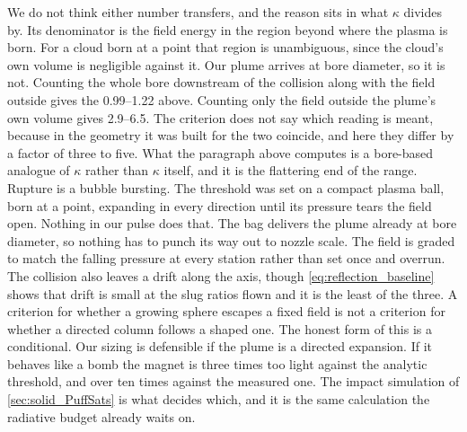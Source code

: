 \documentclass{article}
\begin{document}
We do not think either number transfers, and the reason sits in what $\kappa$ divides by. Its denominator is the field energy in the region beyond where the plasma is born. For a cloud born at a point that region is unambiguous, since the cloud's own volume is negligible against it. Our plume arrives at bore diameter, so it is not. Counting the whole bore downstream of the collision along with the field outside gives the \numrange{0.99}{1.22} above. Counting only the field outside the plume's own volume gives \numrange{2.9}{6.5}. The criterion does not say which reading is meant, because in the geometry it was built for the two coincide, and here they differ by a factor of three to five. What the paragraph above computes is a bore-based analogue of $\kappa$ rather than $\kappa$ itself, and it is the flattering end of the range. Rupture is a bubble bursting. The threshold was set on a compact plasma ball, born at a point, expanding in every direction until its pressure tears the field open. Nothing in our pulse does that. The bag delivers the plume already at bore diameter, so nothing has to punch its way out to nozzle scale. The field is graded to match the falling pressure at every station rather than set once and overrun. The collision also leaves a drift along the axis, though \autoref{eq:reflection_baseline} shows that drift is small at the slug ratios flown and it is the least of the three. A criterion for whether a growing sphere escapes a fixed field is not a criterion for whether a directed column follows a shaped one. The honest form of this is a conditional. Our sizing is defensible if the plume is a directed expansion. If it behaves like a bomb the magnet is three times too light against the analytic threshold, and over ten times against the measured one. The impact simulation of \autoref{sec:solid_PuffSats} is what decides which, and it is the same calculation the radiative budget already waits on.
\end{document}
